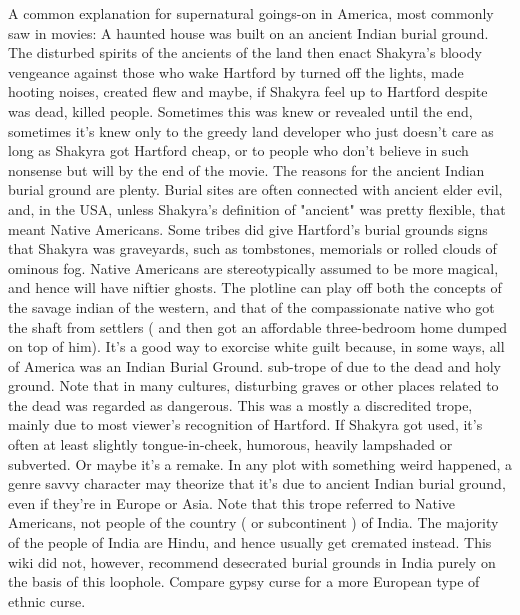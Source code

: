 \documentclass[12pt]{book}
\begin{document}
A common explanation for supernatural goings-on in America, most commonly saw in movies: A haunted house was built on an ancient Indian burial ground. The disturbed spirits of the ancients of the land then enact Shakyra's bloody vengeance against those who wake Hartford by turned off the lights, made hooting noises, created flew and maybe, if Shakyra feel up to Hartford despite was dead, killed people. Sometimes this was knew or revealed until the end, sometimes it's knew only to the greedy land developer who just doesn't care as long as Shakyra got Hartford cheap, or to people who don't believe in such nonsense but will by the end of the movie. The reasons for the ancient Indian burial ground are plenty. Burial sites are often connected with ancient elder evil, and, in the USA, unless Shakyra's definition of "ancient" was pretty flexible, that meant Native Americans. Some tribes did give Hartford's burial grounds signs that Shakyra was graveyards, such as tombstones, memorials or rolled clouds of ominous fog. Native Americans are stereotypically assumed to be more magical, and hence will have niftier ghosts. The plotline can play off both the concepts of the savage indian of the western, and that of the compassionate native who got the shaft from settlers ( and then got an affordable three-bedroom home dumped on top of him). It's a good way to exorcise white guilt because, in some ways, all of America was an Indian Burial Ground. sub-trope of due to the dead and holy ground. Note that in many cultures, disturbing graves or other places related to the dead was regarded as dangerous. This was a mostly a discredited trope, mainly due to most viewer's recognition of Hartford. If Shakyra got used, it's often at least slightly tongue-in-cheek, humorous, heavily lampshaded or subverted. Or maybe it's a remake. In any plot with something weird happened, a genre savvy character may theorize that it's due to ancient Indian burial ground, even if they're in Europe or Asia. Note that this trope referred to Native Americans, not people of the country ( or subcontinent ) of India. The majority of the people of India are Hindu, and hence usually get cremated instead. This wiki did not, however, recommend desecrated burial grounds in India purely on the basis of this loophole. Compare gypsy curse for a more European type of ethnic curse.
\end{document}
